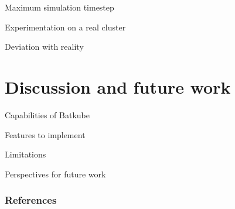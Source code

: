 \documentclass[12pt, aspectratio=43]{beamer}
\begin{document}
\begin{frame}{Maximum simulation timestep}
\end{frame}

\begin{frame}{Experimentation on a real cluster}
\end{frame}

\begin{frame}{Deviation with reality}
\end{frame}

\section{Discussion and future work}
\begin{frame}{Capabilities of Batkube}
\end{frame}

\begin{frame}{Features to implement}
\end{frame}

\begin{frame}{Limitations}
\end{frame}

\begin{frame}{Perspectives for future work}
\end{frame}

\begin{frame}[allowframebreaks]
        \frametitle{References}
	
\end{frame}
\end{document}
